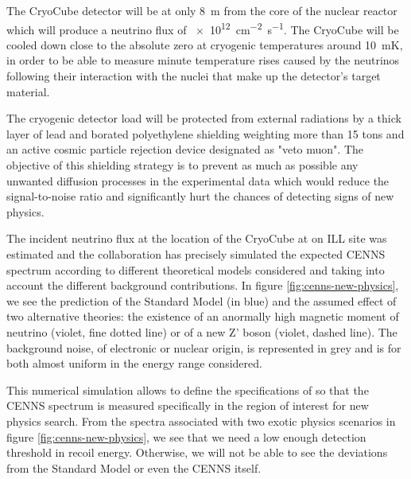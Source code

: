 The CryoCube detector will be at only \SI{8}{\m} from the core of the nuclear reactor which will produce a neutrino flux of \SI{e12}{\cm^{-2} \s^{-1}}. The CryoCube will be cooled down close to the absolute zero at cryogenic temperatures around \SI{10}{\milli\kelvin}, in order to be able to measure minute temperature rises caused by the neutrinos following their interaction with the nuclei that make up the detector's target material.

The cryogenic detector load will be protected from external radiations by a thick layer of lead and borated polyethylene shielding weighting more than 15 tons and an active cosmic particle rejection device designated as "veto muon". The objective of this shielding strategy is to prevent as much as possible any unwanted diffusion processes in the experimental data which would reduce the signal-to-noise ratio and significantly hurt the chances of detecting signs of new physics.

The incident neutrino flux at the location of the CryoCube at on ILL site was estimated and
the collaboration has precisely simulated the expected CENNS spectrum according to different theoretical models considered and taking into account the different background contributions. In figure \ref{fig:cenns-new-physics}, we see the prediction of the Standard Model (in blue) and the assumed effect of two alternative theories: the existence of an anormally high magnetic moment of neutrino (violet, fine dotted line) or of a new Z' boson (violet, dashed line). The background noise, of electronic or nuclear origin, is represented in grey and is for both almost uniform in the energy range considered.

This numerical simulation allows to define the specifications of \Ricochet{} so that the CENNS spectrum is measured specifically in the region of interest for new physics search. From the spectra associated with two exotic physics scenarios in figure \ref{fig:cenns-new-physics}, we see that we need a low enough detection threshold in recoil energy. Otherwise, we will not be able to see the deviations from the Standard Model or even the CENNS itself.

